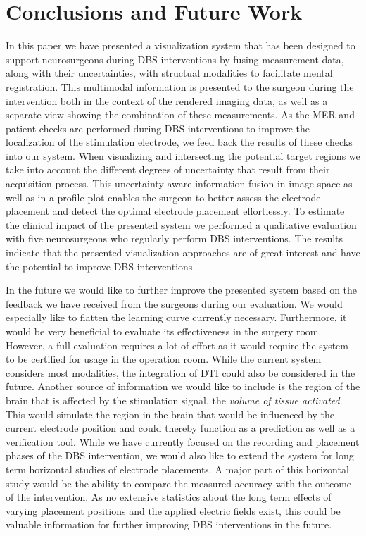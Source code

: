 \documentclass[review]{vgtc}                 %
\begin{document}
\section{Conclusions and Future Work}\label{sec:conclusions}
In this paper we have presented a visualization system that has been designed to support neurosurgeons during DBS interventions by fusing measurement data, along with their uncertainties, with structual modalities to facilitate mental registration. This multimodal information is presented to the surgeon during the intervention both in the context of the rendered imaging data, as well as a separate view showing the combination of these measurements. As the MER and patient checks are performed during DBS interventions to improve the localization of the stimulation electrode, we feed back the results of these checks into our system. When visualizing and intersecting the potential target regions we take into account the different degrees of uncertainty that result from their acquisition process. This uncertainty-aware information fusion in image space as well as in a profile plot enables the surgeon to better assess the electrode placement and detect the optimal electrode placement effortlessly. To estimate the clinical impact of the presented system we performed a qualitative evaluation with five neurosurgeons who regularly perform DBS interventions. The results indicate that the presented visualization approaches are of great interest and have the potential to improve DBS interventions.

In the future we would like to further improve the presented system based on the feedback we have received from the surgeons during our evaluation. We would especially like to flatten the learning curve currently necessary. Furthermore, it would be very beneficial to evaluate its effectiveness in the surgery room. However, a full evaluation requires a lot of effort as it would require the system to be certified for usage in the operation room. While the current system considers most modalities, the integration of DTI could also be considered in the future. Another source of information we would like to include is the region of the brain that is affected by the stimulation signal, the \emph{volume of tissue activated}. This would simulate the region in the brain that would be influenced by the current electrode position and could thereby function as a prediction as well as a verification tool. While we have currently focused on the recording and placement phases of the DBS intervention, we would also like to extend the system for long term horizontal studies of electrode placements. A major part of this horizontal study would be the ability to compare the measured accuracy with the outcome of the intervention. As no extensive statistics about the long term effects of varying placement positions and the applied electric fields exist, this could be valuable information for further improving DBS interventions in the future.
\end{document}
